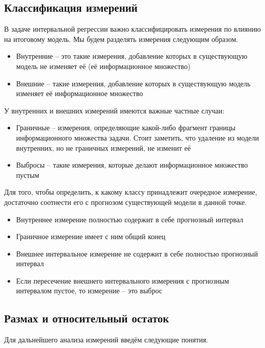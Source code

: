 \subsection{Классификация измерений}

В задаче интервальной регрессии важно классифицировать измерения по влиянию на итоговому модель. Мы будем разделять измерения следующим образом.

\begin{itemize}
	\item Внутренние -- это такие измерения, добавление которых в существующую модель не изменяет её (её информационное множество)
	\item Внешние -- такие измерения, добавление которых в существующую модель изменяет её информационное множество
\end{itemize}

У внутренних и внешних измерений имеются важные частные случаи:

\begin{itemize}
	\item Граничные -- измерения, определяющие какой-либо фрагмент границы информационного множества задачи. Стоит заметить, что удаление из модели внутренних, но не граничных измерений, не изменит её
	\item Выбросы -- такие измерения, которые делают информационное множество пустым
\end{itemize}

Для того, чтобы определить, к какому классу принадлежит очередное измерение, достаточно соотнести его с прогнозом существующей модели в данной точке.

\begin{itemize}
	\item Внутреннее измерение полностью содержит в себе прогнозный интервал
	\item Граничное измерение имеет с ним общий конец
	\item Внешнее интервальное измерение не содержит в себе полностью прогнозный интервал
	\item Если пересечение внешнего интервального измерения с прогнозным интервалом пустое, то измерение -- это выброс
\end{itemize}

\subsection{Размах и относительный остаток}

Для дальнейшего анализа измерений введём следующие понятия.


